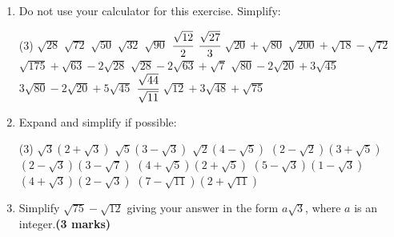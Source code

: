 \documentclass[fleqn, twoside]{article}
\begin{document}
\exercise{}
\begin{enumerate}
    \item Do not use your calculator for this exercise. Simplify:
        \begin{tasks}(3) %
            \task $\sqrt{28}$                            %
            \task $\sqrt{72}$                            %
            \task $\sqrt{50}$                            %
            \task $\sqrt{32}$                            %
            \task $\sqrt{90}$                            %
            \task $\cfrac{\sqrt{12}}{2}$\vspace{-1mm}    %
            \task $\cfrac{\sqrt{27}}{3}$                 %
            \task $\sqrt{20}+\sqrt{80}$                  %
            \task $\sqrt{200}+\sqrt{18}-\sqrt{72}$       %
            \task $\sqrt{175}+\sqrt{63}-2\sqrt{28}$      %
            \task $\sqrt{28}-2\sqrt{63}+\sqrt{7}$        %
            \task $\sqrt{80}-2\sqrt{20}+3\sqrt{45}$      %
            \task $3\sqrt{80}-2\sqrt{20}+5\sqrt{45}$     %
            \task $\cfrac{\sqrt{44}}{\sqrt{11}}$         %
            \task $\sqrt{12}+3\sqrt{48}+\sqrt{75}$       %
        \end{tasks}
    \item Expand and simplify if possible:
        \begin{tasks}(3) %
            \task $\sqrt{3}(2+\sqrt{3})$                 %
            \task $\sqrt{5}(3-\sqrt{3})$                 %
            \task $\sqrt{2}(4-\sqrt{5})$                 %
            \task $(2-\sqrt{2})(3+\sqrt{5})$             %
            \task $(2-\sqrt{3})(3-\sqrt{7})$             %
            \task $(4+\sqrt{5})(2+\sqrt{5})$             %
            \task $(5-\sqrt{3})(1-\sqrt{3})$             %
            \task $(4+\sqrt{3})(2-\sqrt{3})$             %
            \task $(7-\sqrt{11})(2+\sqrt{11})$           %
        \end{tasks}
    \item Simplify $\sqrt{75}-\sqrt{12}$ giving your answer in the form $a\sqrt{3}$, where $a$ is an integer.\hfill\textbf{(3 marks)} %
\end{enumerate}
\end{document}
